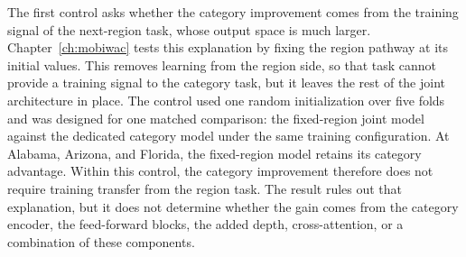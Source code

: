 The first control asks whether the category improvement comes from the training signal
of the next-region task, whose output space is much larger. Chapter~\ref{ch:mobiwac}
tests this explanation by fixing the region pathway at its initial values. This removes
learning from the region side, so that task cannot provide a training signal to the
category task, but it leaves the rest of the joint architecture in place. The control
used one random initialization over five folds and was designed for one matched
comparison: the fixed-region joint model against the dedicated category model under
the same training configuration. At Alabama, Arizona, and Florida, the fixed-region
model retains its category advantage. Within this control, the category improvement
therefore does not require training transfer from the region task. The result rules out
that explanation, but it does not determine whether the gain comes from the category
encoder, the feed-forward blocks, the added depth, cross-attention, or a combination of
these components.
